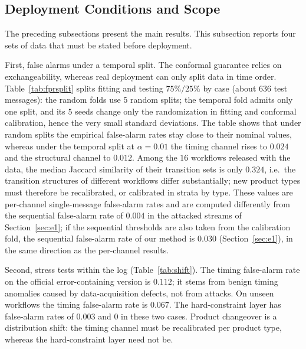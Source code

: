 \documentclass[manuscript,screen,review]{acmart}
\begin{document}
\subsection{Deployment Conditions and Scope}
\label{sec:boundary}
\label{sec:e5}
\label{sec:robust}
\label{sec:gate}
\label{sec:e6}
\label{sec:e8}

The preceding subsections present the main results. This subsection reports four sets of data that must be stated before deployment.

First, false alarms under a temporal split. The conformal guarantee relies on exchangeability, whereas real deployment can only split data in time order. Table~\ref{tab:fprsplit} splits fitting and testing $75\%/25\%$ by case (about $636$ test messages): the random folds use $5$ random splits; the temporal fold admits only one split, and its $5$ seeds change only the randomization in fitting and conformal calibration, hence the very small standard deviations. The table shows that under random splits the empirical false-alarm rates stay close to their nominal values, whereas under the temporal split at $\alpha=0.01$ the timing channel rises to $0.024$ and the structural channel to $0.012$. Among the $16$ workflows released with the data, the median {Jaccard} similarity of their transition sets is only $0.324$, i.e.\ the transition structures of different workflows differ substantially; new product types must therefore be recalibrated, or calibrated in strata by type. These values are per-channel single-message false-alarm rates and are computed differently from the sequential false-alarm rate of $0.004$ in the attacked streams of Section~\ref{sec:e1}; if the sequential thresholds are also taken from the calibration fold, the sequential false-alarm rate of our method is $0.030$ (Section~\ref{sec:e1}), in the same direction as the per-channel results.

Second, stress tests within the log (Table~\ref{tab:shift}). The timing false-alarm rate on the official error-containing version is $0.112$; it stems from benign timing anomalies caused by data-acquisition defects, not from attacks. On unseen workflows the timing false-alarm rate is $0.067$. The hard-constraint layer has false-alarm rates of $0.003$ and $0$ in these two cases. Product changeover is a distribution shift: the timing channel must be recalibrated per product type, whereas the hard-constraint layer need not be.
\end{document}

